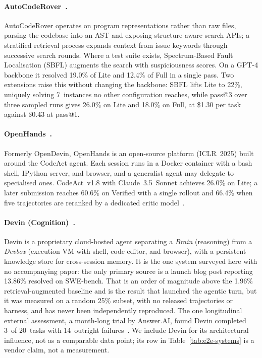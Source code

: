 \documentclass[
  english,        %
  font=times,     %
  twocolumn,      %
]{tumarticle}
\begin{document}
\paragraph{AutoCodeRover~\cite{zhang2024autocoderover}.}
AutoCodeRover operates on program representations rather than raw files, parsing
the codebase into an AST and exposing structure-aware search APIs; a stratified
retrieval process expands context from issue keywords through successive search
rounds. Where a test suite exists, Spectrum-Based Fault Localisation (SBFL)
augments the search with suspiciousness scores. On a GPT-4 backbone it resolved
19.0\% of Lite and 12.4\% of Full in a single pass. Two extensions raise this
without changing the backbone: SBFL lifts Lite to 22\%, uniquely solving
7~instances no other configuration reaches, while pass@3 over three sampled runs
gives 26.0\% on Lite and 18.0\% on Full, at \$1.30 per task against \$0.43 at
pass@1.

\paragraph{OpenHands~\cite{wang2024openhands}.}
Formerly OpenDevin, OpenHands is an open-source platform (ICLR~2025) built around
the CodeAct agent. Each session runs in a Docker container with a bash shell,
IPython server, and browser, and a generalist agent may delegate to specialised
ones. CodeAct~v1.8 with Claude~3.5~Sonnet achieves 26.0\% on Lite; a later
submission reaches 60.6\% on Verified with a single rollout and 66.4\% when five
trajectories are reranked by a dedicated critic
model~\cite{openhands2025verified}.

\paragraph{Devin (Cognition)~\cite{cognition2024devin}.}
Devin is a proprietary cloud-hosted agent separating a \emph{Brain} (reasoning)
from a \emph{Devbox} (execution VM with shell, code editor, and browser), with a
persistent knowledge store for cross-session memory. It is the one system surveyed
here with no accompanying paper: the only primary source is a launch blog post
reporting 13.86\% resolved on SWE-bench. That is an order of magnitude above the
1.96\% retrieval-augmented baseline and is the result that launched the agentic
turn, but it was measured on a random 25\% subset, with no released trajectories
or harness, and has never been independently reproduced. The one longitudinal
external assessment, a month-long trial by Answer.AI, found Devin completed 3~of
20~tasks with 14~outright failures~\cite{answerai2025devin}. We include Devin for
its architectural influence, not as a comparable data point; its row in
Table~\ref{tab:e2e-systems} is a vendor claim, not a measurement.
\end{document}
